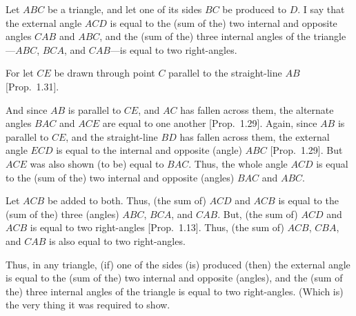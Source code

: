 \begin{Parallel}{}{}
{Let $ABC$ be a triangle, and let one of its sides $BC$ be produced to $D$.
I say that the external angle $ACD$ is equal to the (sum of the) two internal and opposite
angles $CAB$ and $ABC$, and the (sum of the) three internal angles of the triangle---$ABC$, $BCA$, and $CAB$---is equal to two right-angles.

For let $CE$ be drawn through point $C$ parallel to the straight-line
$AB$ [Prop.~1.31].

And since $AB$ is parallel to $CE$, and $AC$ has fallen across them, the alternate
angles $BAC$ and $ACE$ are equal to one another [Prop.~1.29]. Again,
since $AB$ is parallel to $CE$, and the straight-line $BD$ has fallen across them, 
the external angle $ECD$ is equal to the internal and opposite (angle)
$ABC$ [Prop.~1.29]. But $ACE$ was also shown (to be) equal to $BAC$. Thus, the whole
angle $ACD$ is equal to the (sum of the) two internal and opposite (angles) $BAC$ and $ABC$.

Let $ACB$ be added to both. Thus, (the sum of) $ACD$ and $ACB$ is equal to
the (sum of the) three (angles) $ABC$, $BCA$, and $CAB$. But, (the sum of) $ACD$ and $ACB$ is equal
to two right-angles [Prop.~1.13]. Thus, (the sum of) $ACB$, $CBA$, and $CAB$ is also
equal to two right-angles.

Thus, in any triangle,  (if) one of the sides  (is) produced (then) the external
angle is equal to the (sum of the) two internal and opposite (angles), and the (sum of the) three
internal angles of the triangle is equal to two right-angles. (Which is)
the very thing it was required to show.}
\end{Parallel}


